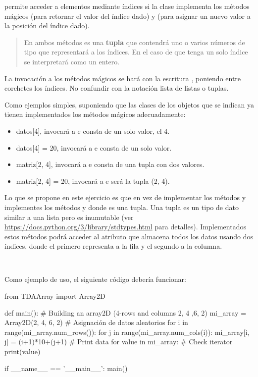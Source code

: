  permite acceder a elementos mediante índices si  la clase implementa los métodos mágicos  (para retornar el valor del índice dado) y 
 (para asignar un nuevo valor a la posición del índice dado). 

\begin{quotation}
En ambos métodos  es una \textbf{tupla} que contendrá uno o varios números de tipo  que representará a los índices. En el caso de que  tenga un solo índice se interpretará como un entero. 
\end{quotation}
 
La invocación a los métodos mágicos se hará con la escritura , poniendo entre corchetes los índices. No confundir con la notación lista  de listas o tuplas.

Como ejemplos simples, suponiendo que las clases de los objetos que se indican ya tienen implementados los métodos mágicos adecuadamente:
\begin{itemize}
\item datos[4],  invocará a   e  consta de un solo valor, el 4.
\item datos[4] = 20, invocará a  e  consta de un solo valor.
\item matriz[2, 4],  invocará a   e  consta de una tupla con dos valores.
\item matriz[2, 4] = 20, invocará a  e  será la tupla (2, 4).
\end{itemize}




Lo que se propone en este ejercicio es que en vez de  implementar los métodos  y  implementes los métodos  y  donde  es una tupla. Una tupla es un tipo de dato similar a una lista pero es inumutable (ver \url{https://docs.python.org/3/library/stdtypes.html} para detalles). Implementados estos métodos podrá acceder al atributo que almacena todos los datos usando dos índices, donde el primero representa a la fila y el segundo a la columna.

\

Como ejemplo  de uso, el siguiente código debería funcionar:
\begin{pyverbatim}[][frame=single]
from TDAArray import Array2D

def main():
    # Building an array2D (4-rows and columns 2, 4 ,6, 2)
    mi_array = Array2D(2, 4, 6, 2)
    # Asignación de  datos  aleatorios
    for i in range(mi_array.num_rows()):
        for j in range(mi_array.num_cols(i)):
            mi_array[i, j] = (i+1)*10+(j+1)
    # Print data
    for value in mi_array:   # Check iterator
        print(value)

if __name__ == '__main__':
    main()
\end{pyverbatim}




